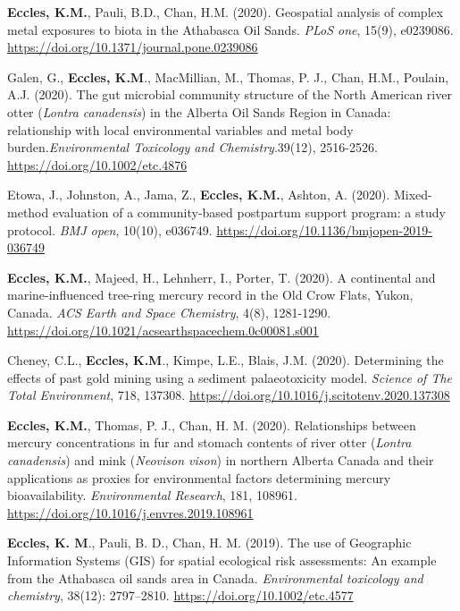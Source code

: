 \documentclass[margin,line]{res}
\begin{document}
\begin{resume}
\begin{etaremune}[start=26]
\item \textbf{Eccles, K.M.}, Pauli, B.D., Chan, H.M. (2020). Geospatial analysis of complex metal exposures to biota in the Athabasca Oil Sands. \textit{PLoS one}, 15(9), e0239086. \url{https://doi.org/10.1371/journal.pone.0239086}

\item Galen, G., \textbf{Eccles, K.M}., MacMillian, M., Thomas, P. J., Chan, H.M., Poulain, A.J. (2020). The gut microbial community structure of the North American river otter (\textit{Lontra canadensis}) in the Alberta Oil Sands Region in Canada: relationship with local environmental variables and metal body burden.\textit{Environmental Toxicology and Chemistry}.39(12), 2516-2526. \url{https://doi.org/10.1002/etc.4876}

\item Etowa, J., Johnston, A., Jama, Z., \textbf{Eccles, K.M.}, Ashton, A. (2020). Mixed-method evaluation of a community-based postpartum support program: a study protocol. \textit{BMJ open}, 10(10), e036749. \url{https://doi.org/10.1136/bmjopen-2019-036749}

\item \textbf{Eccles, K.M.}, Majeed, H., Lehnherr, I., Porter, T. (2020). A continental and marine-influenced tree-ring mercury record in the Old Crow Flats, Yukon, Canada. \textit{ACS Earth and Space Chemistry}, 4(8), 1281-1290. \url{https://doi.org/10.1021/acsearthspacechem.0c00081.s001}

\item Cheney, C.L., \textbf{Eccles, K.M}., Kimpe, L.E., Blais, J.M. (2020). Determining the effects of past gold mining using a sediment palaeotoxicity model. \textit{Science of The Total Environment}, 718, 137308. \url{https://doi.org/10.1016/j.scitotenv.2020.137308}

\item \textbf{Eccles, K.M.}, Thomas, P. J., Chan, H. M. (2020). Relationships between mercury concentrations in fur and stomach contents of river otter (\textit{Lontra canadensis}) and mink (\textit{Neovison vison}) in northern Alberta Canada and their applications as proxies for environmental factors determining mercury bioavailability. \textit{Environmental Research}, 181, 108961. \url{https://doi.org/10.1016/j.envres.2019.108961}

\item \textbf{Eccles, K. M}., Pauli, B. D., Chan, H. M. (2019). The use of Geographic Information Systems (GIS) for spatial ecological risk assessments: An example from the Athabasca oil sands area in Canada. \textit{Environmental toxicology and chemistry}, 38(12): 2797–2810. \url{https://doi.org/10.1002/etc.4577}


\end{etaremune}
\end{resume}
\end{document}
